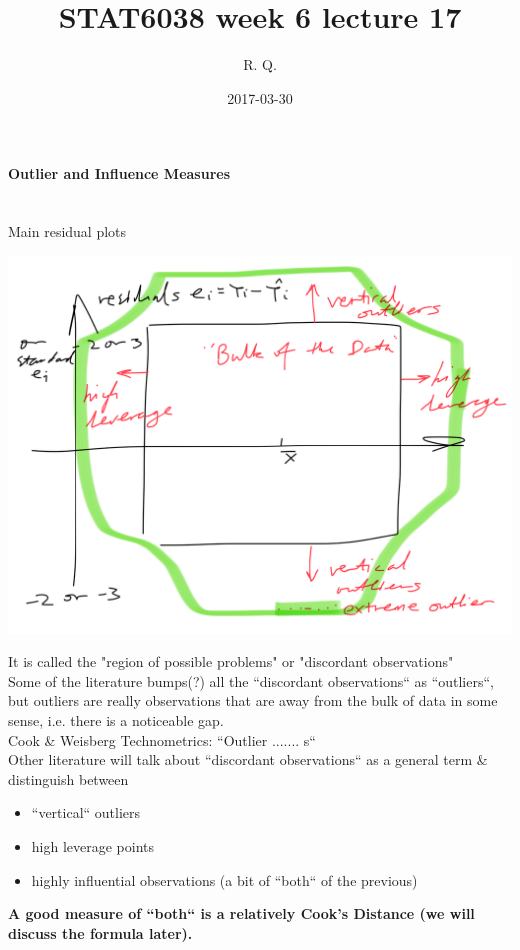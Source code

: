 \documentclass[a4paper, 11pt, twoside]{article}
\begin{document}
\title{STAT6038 week 6 lecture 17}
\author{R. Q.}
\date{2017-03-30}

\maketitle

\paragraph{Outlier and Influence Measures}\ \\

Main residual plots

\includegraphics[width=\textwidth]{main-residual}

It is called the "region of possible problems" or "discordant observations"\\

Some of the literature bumps(?) all the ``discordant observations`` as ``outliers``, but outliers are really observations that are away from the bulk of data in some sense, i.e. there is a noticeable gap.\\

Cook \& Weisberg Technometrics: ``Outlier ....... s``\\

Other literature will talk about ``discordant observations`` as a general term \& distinguish between 

\begin{itemize}
	\item ``vertical`` outliers
	\item high leverage points
	\item highly influential observations (a bit of ``both`` of the previous)\\
\end{itemize}

\textbf{A good measure of ``both`` is a relatively Cook's Distance (we will discuss the formula later).}\\
\end{document}
